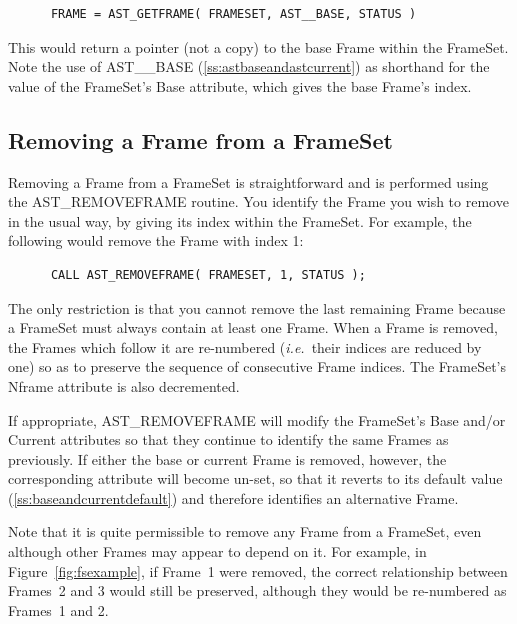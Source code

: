 \documentclass[twoside,11pt]{article}
\newcommand{\htmlref}[2]{#1}
\newcommand{\secref}[1]{\S\ref{#1}}
\renewcommand{\secref}[1]{\ref{#1}}
\begin{document}
\small
\begin{verbatim}
      FRAME = AST_GETFRAME( FRAMESET, AST__BASE, STATUS )
\end{verbatim}
\normalsize

This would return a pointer (not a copy) to the base Frame within the
FrameSet. Note the use of AST\_\_BASE
(\secref{ss:astbaseandastcurrent}) as shorthand for the value of the
FrameSet's \htmlref{Base}{Base} attribute, which gives the base Frame's index.

\subsection{Removing a Frame from a FrameSet}

Removing a \htmlref{Frame}{Frame} from a \htmlref{FrameSet}{FrameSet} is straightforward and is performed
using the \htmlref{AST\_REMOVEFRAME}{AST_REMOVEFRAME} routine. You identify the Frame you wish to
remove in the usual way, by giving its index within the FrameSet. For
example, the following would remove the Frame with index 1:

\small
\begin{verbatim}
      CALL AST_REMOVEFRAME( FRAMESET, 1, STATUS );
\end{verbatim}
\normalsize

The only restriction is that you cannot remove the last remaining
Frame because a FrameSet must always contain at least one Frame.  When
a Frame is removed, the Frames which follow it are re-numbered
({\em{i.e.}}\ their indices are reduced by one) so as to preserve the
sequence of consecutive Frame indices.  The FrameSet's \htmlref{Nframe}{Nframe}
attribute is also decremented.

If appropriate, AST\_REMOVEFRAME will modify the FrameSet's \htmlref{Base}{Base}
and/or \htmlref{Current}{Current} attributes so that they continue to identify the same
Frames as previously. If either the base or current Frame is removed,
however, the corresponding attribute will become un-set, so that it
reverts to its default value (\secref{ss:baseandcurrentdefault}) and
therefore identifies an alternative Frame.

Note that it is quite permissible to remove any Frame from a FrameSet,
even although other Frames may appear to depend on it. For example, in
Figure~\ref{fig:fsexample}, if Frame~1 were removed, the correct
relationship between Frames~2 and 3 would still be preserved, although
they would be re-numbered as Frames~1 and 2.
\end{document}
